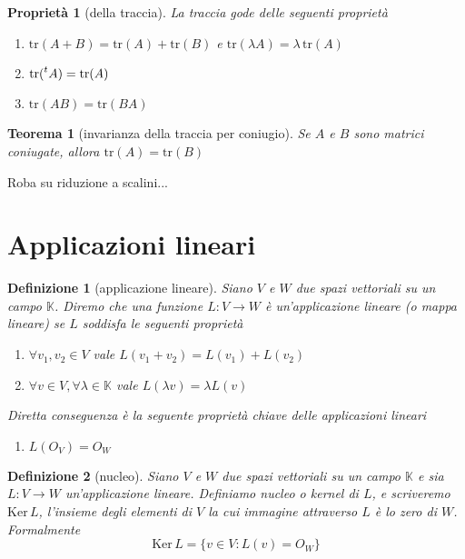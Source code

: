 \documentclass[9pt, a4paper]{article}
\newcommand{\K}{\mathbb{K}}
\newcommand{\Ker}{\mathrm{Ker}\,}
\newcommand{\tr}{\mathrm{tr}}
\theoremstyle{mythm}
\newtheorem{definition}{Definizione}[section]
\newtheorem{propriety}{Proprietà}[section]
\newtheorem{thm}{Teorema}[section]
\begin{document}
\begin{propriety}[della traccia]
	La traccia gode delle seguenti proprietà
	\begin{enumerate}[label=(\roman*)]
		\item $ \tr (A + B) = \tr(A) + \tr(B) $ e $ \tr(\lambda A) = \lambda \, \tr (A) $
		\item $ \tr(\prescript{t}{}{A}) = \tr (A) $
		\item $ \tr (AB) = \tr (BA) $
	\end{enumerate}
\end{propriety}

\begin{thm}[invarianza della traccia per coniugio]
	Se $ A $ e $ B $ sono matrici coniugate, allora $ \tr (A) = \tr (B) $
\end{thm}

Roba su riduzione a scalini...

\clearpage

\section{Applicazioni lineari}

\begin{definition}[applicazione lineare]
	Siano $ V $ e $ W $ due spazi vettoriali su un campo $ \K $. Diremo che una funzione $ L \colon V \to W  $ è un'applicazione lineare (o mappa lineare) se $ L $ soddisfa le seguenti proprietà
	\begin{enumerate}[label=(\roman*)]
		\item $ \forall v_1, v_2 \in V $ vale $ L(v_1 + v_2) = L(v_1) + L(v_2) $
		\item $ \forall v \in V, \forall \lambda \in \K $ vale $ L(\lambda v) = \lambda L(v)$
	\end{enumerate}
	Diretta conseguenza è la seguente proprietà chiave delle applicazioni lineari
	\begin{enumerate}[resume, label=(\roman*)]
		\item $ L(O_V) =O_W $
	\end{enumerate}
\end{definition}

\begin{definition}[nucleo]
	Siano $ V $ e $ W $ due spazi vettoriali su un campo $ \K $ e sia $ L \colon V \to W  $ un'applicazione lineare. Definiamo nucleo o kernel di $ L $, e scriveremo $ \Ker L$, l'insieme degli elementi di $ V $ la cui immagine attraverso $ L $ è lo zero di $ W $. Formalmente \[\Ker L = \{v \in V \colon L(v) = O_W\} \]
\end{definition}
\end{document}
